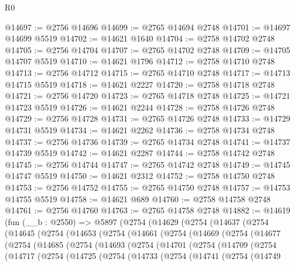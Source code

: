\begin{lexlean}{R0}
\begin{coremodule}
@14697 := @2756 @14696
@14699 := @2765 @14694 @2748
@14701 := @14697 @14699 @5519
@14702 := @14621 @1640
@14704 := @2758 @14702 @2748
@14705 := @2756 @14704
@14707 := @2765 @14702 @2748
@14709 := @14705 @14707 @5519
@14710 := @14621 @1796
@14712 := @2758 @14710 @2748
@14713 := @2756 @14712
@14715 := @2765 @14710 @2748
@14717 := @14713 @14715 @5519
@14718 := @14621 @2227
@14720 := @2758 @14718 @2748
@14721 := @2756 @14720
@14723 := @2765 @14718 @2748
@14725 := @14721 @14723 @5519
@14726 := @14621 @2244
@14728 := @2758 @14726 @2748
@14729 := @2756 @14728
@14731 := @2765 @14726 @2748
@14733 := @14729 @14731 @5519
@14734 := @14621 @2262
@14736 := @2758 @14734 @2748
@14737 := @2756 @14736
@14739 := @2765 @14734 @2748
@14741 := @14737 @14739 @5519
@14742 := @14621 @2287
@14744 := @2758 @14742 @2748
@14745 := @2756 @14744
@14747 := @2765 @14742 @2748
@14749 := @14745 @14747 @5519
@14750 := @14621 @2312
@14752 := @2758 @14750 @2748
@14753 := @2756 @14752
@14755 := @2765 @14750 @2748
@14757 := @14753 @14755 @5519
@14758 := @14621 @689
@14760 := @2758 @14758 @2748
@14761 := @2756 @14760
@14763 := @2765 @14758 @2748
@14882 := @14619
    (fun (__b : @2550) =>
    @5897
      (@2754
        (@14629
          (@2754
            (@14637
              (@2754
                (@14645
                  (@2754
                    (@14653
                      (@2754
                        (@14661
                          (@2754
                            (@14669
                              (@2754
                                (@14677
                                  (@2754
                                    (@14685
                                      (@2754
                                        (@14693
                                          (@2754
                                            (@14701
                                              (@2754
                                                (@14709
                                                  (@2754
                                                    (@14717
                                                      (@2754
                                                        (@14725
                                                          (@2754
                                                            (@14733
                                                              (@2754
                                                                (@14741
                                                                  (@2754
                                                                    (@14749

\end{coremodule}
\end{lexlean}
